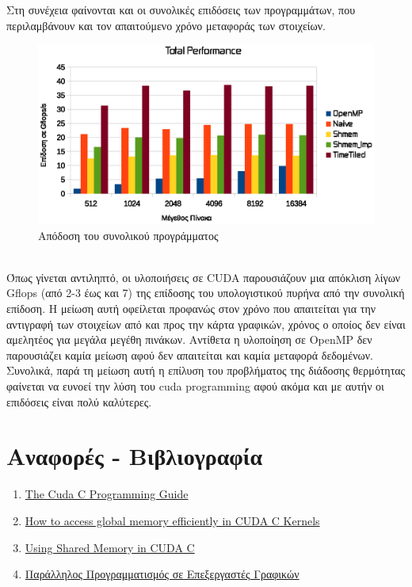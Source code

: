 \documentclass[11pt,a4paper]{article}
\begin{document}
Στη συνέχεια φαίνονται και οι συνολικές επιδόσεις των προγραμμάτων, που περιλαμβάνουν και τον απαιτούμενο χρόνο μεταφοράς των στοιχείων. \\
\begin{figure}[h]
	\centering
	\includegraphics[width=\textwidth]{total.eps}
	\caption{Απόδοση του συνολικού προγράμματος}
\end{figure} \\
Όπως γίνεται αντιληπτό, οι υλοποιήσεις σε CUDA παρουσιάζουν μια απόκλιση λίγων Gflops (από 2-3 έως και 7) της επίδοσης του υπολογιστικού πυρήνα από την συνολική επίδοση. H μείωση αυτή οφείλεται προφανώς στον χρόνο που απαιτείται για την αντιγραφή των στοιχείων από και προς την κάρτα γραφικών, χρόνος ο οποίος δεν είναι αμελητέος για μεγάλα μεγέθη πινάκων. Αντίθετα η υλοποίηση σε OpenMP δεν παρουσιάζει καμία μείωση αφού δεν απαιτείται και καμία μεταφορά δεδομένων. \\
Συνολικά, παρά τη μείωση αυτή η επίλυση του προβλήματος της διάδοσης θερμότητας φαίνεται να ευνοεί την λύση του cuda programming αφού ακόμα και με αυτήν οι επιδόσεις είναι πολύ καλύτερες.

\newpage

\section*{Αναφορές - Βιβλιογραφία}
\begin{enumerate}
\item 
\href{http://docs.nvidia.com/cuda/cuda-c-programming-guide/}{The Cuda C Programming Guide}
\item  \href{http://devblogs.nvidia.com/parallelforall/how-access-global-memory-efficiently-cuda-c-kernels/}{How to access global memory efficiently in CUDA C Kernels}
\item 
\href{http://devblogs.nvidia.com/parallelforall/using-shared-memory-cuda-cc/}{Using Shared Memory in CUDA C}
\item
\href{http://www.cslab.ece.ntua.gr/courses/pps/files/fall2014/CUDApresentation-Fall2014.pdf}{Παράλληλος Προγραμματισμός σε Επεξεργαστές Γραφικών}
\end{enumerate}
\end{document}
